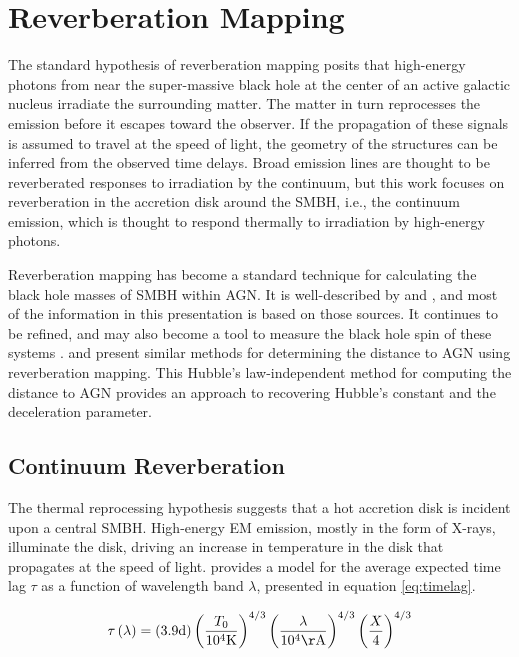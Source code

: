 \documentclass[11pt,letterpaper]{article}
\begin{document}
\section{Reverberation Mapping}
\label{sec:reverbmap}

The standard hypothesis of reverberation mapping posits that high-energy photons from near the super-massive black hole at the center of an active galactic nucleus irradiate the surrounding matter. The matter in turn reprocesses the emission before it escapes toward the observer. If the propagation of these signals is assumed to travel at the speed of light, the geometry of the structures can be inferred from the observed time delays. Broad emission lines are thought to be reverberated responses to irradiation by the continuum, but this work focuses on reverberation in the accretion disk around the SMBH, i.e., the continuum emission, which is thought to respond thermally to irradiation by high-energy photons.

Reverberation mapping has become a standard technique for calculating the black hole masses of SMBH within AGN. It is well-described by \cite{2007MNRAS.380..669C} and \cite{2014A&ARv..22...72U}, and most of the information in this presentation is based on those sources. It continues to be refined, and may also become a tool to measure the black hole spin of these systems \citep{2016Natur.535..388K}. \cite{2007MNRAS.380..669C} and \cite{1999MNRAS.302L..24C} present similar methods for determining the distance to AGN using reverberation mapping. This Hubble's law-independent method for computing the distance to AGN provides an approach to recovering Hubble's constant and the deceleration parameter.


    \subsection{Continuum Reverberation}
    \label{sec:cont_reverb}
    
    The thermal reprocessing hypothesis suggests that a hot accretion disk is incident upon a central SMBH. High-energy EM emission, mostly in the form of X-rays, illuminate the disk, driving an increase in temperature in the disk that propagates at the speed of light. \cite{1999MNRAS.302L..24C} provides a model for the average expected time lag $\tau$ as a function of wavelength band $\lambda$, presented in equation \ref{eq:timelag}.

    \begin{equation}
        \label{eq:timelag}
        \tau\left(\lambda\right) = 
            \left(3.9 \textrm{d}\right) 
            \left(\frac{T_0}{10^4\mathrm{K}}\right)^{4/3}
            \left(\frac{\lambda}{10^4\mathrm{\AA}}\right)^{4/3}
            \left(\frac{X}{4}\right)^{4/3}
    \end{equation}
\end{document}
